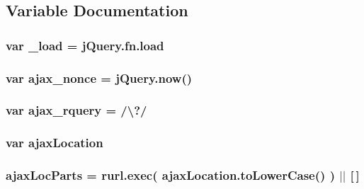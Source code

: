 \subsection{Variable Documentation}
\hypertarget{jquery-1_89_81_8js_ab9d9919a16b6ef96017991e55a3a9e6c}{
\subsubsection[{\+\_\+load}]{\setlength{\rightskip}{0pt plus 5cm}var \+\_\+load = {\bf j\+Query.\+fn.\+load}}}\label{jquery-1_89_81_8js_ab9d9919a16b6ef96017991e55a3a9e6c}
\hypertarget{jquery-1_89_81_8js_aaa43e6d4c76ee8be878dd7e93fb755a4}{
\subsubsection[{ajax\+\_\+nonce}]{\setlength{\rightskip}{0pt plus 5cm}var ajax\+\_\+nonce = j\+Query.\+now()}}\label{jquery-1_89_81_8js_aaa43e6d4c76ee8be878dd7e93fb755a4}
\hypertarget{jquery-1_89_81_8js_a4da85c0011217bf1643139dc23999c5c}{
\subsubsection[{ajax\+\_\+rquery}]{\setlength{\rightskip}{0pt plus 5cm}var ajax\+\_\+rquery = /\textbackslash{}?/}}\label{jquery-1_89_81_8js_a4da85c0011217bf1643139dc23999c5c}
\hypertarget{jquery-1_89_81_8js_a1661d4e1676e7c6ffde5a3cb8d8ae246}{
\subsubsection[{ajax\+Location}]{\setlength{\rightskip}{0pt plus 5cm}var ajax\+Location}}\label{jquery-1_89_81_8js_a1661d4e1676e7c6ffde5a3cb8d8ae246}
\hypertarget{jquery-1_89_81_8js_a4c35110da3c335cfca38505ee65a5e79}{
\subsubsection[{ajax\+Loc\+Parts}]{\setlength{\rightskip}{0pt plus 5cm}ajax\+Loc\+Parts = rurl.\+exec( ajax\+Location.\+to\+Lower\+Case() ) $\vert$$\vert$ \mbox{[}$\,$\mbox{]}}}\label{jquery-1_89_81_8js_a4c35110da3c335cfca38505ee65a5e79}
